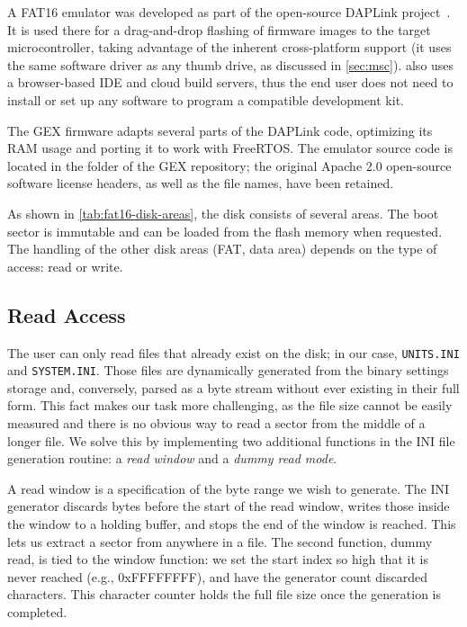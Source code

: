 A FAT16 emulator was developed as part of the open-source \mbed DAPLink project~\cite{daplink}. It is used there for a drag-and-drop flashing of firmware images to the target microcontroller, taking advantage of the inherent cross-platform support (it uses the same software driver as any thumb drive, as discussed in \cref{sec:msc}). \mbed also uses a browser-based \gls{IDE} and cloud build servers, thus the end user does not need to install or set up any software to program a compatible development kit.

The GEX firmware adapts several parts of the DAPLink code, optimizing its \gls{RAM} usage and porting it to work with FreeRTOS. The emulator source code is located in the  folder of the GEX repository; the original Apache 2.0 open-source software license headers, as well as the file names, have been retained.

As shown in \cref{tab:fat16-disk-areas}, the disk consists of several areas. The boot sector is immutable and can be loaded from the flash memory when requested. The handling of the other disk areas (\gls{FAT}, data area) depends on the type of access: read or write.

\subsection{Read Access}

The user can only read files that already exist on the disk; in our case, \verb|UNITS.INI| and \verb|SYSTEM.INI|. Those files are dynamically generated from the binary settings storage and, conversely, parsed as a byte stream without ever existing in their full form. This fact makes our task more challenging, as the file size cannot be easily measured and there is no obvious way to read a sector from the middle of a longer file. We solve this by implementing two additional functions in the INI file generation routine: a \textit{read window} and a \textit{dummy read mode}.

A read window is a specification of the byte range we wish to generate. The INI generator discards bytes before the start of the read window, writes those inside the window to a holding buffer, and stops the end of the window is reached. This lets us extract a sector from anywhere in a file. The second function, dummy read, is tied to the window function: we set the start index so high that it is never reached (e.g., 0xFFFFFFFF), and have the generator count discarded characters. This character counter holds the full file size once the generation is completed.


